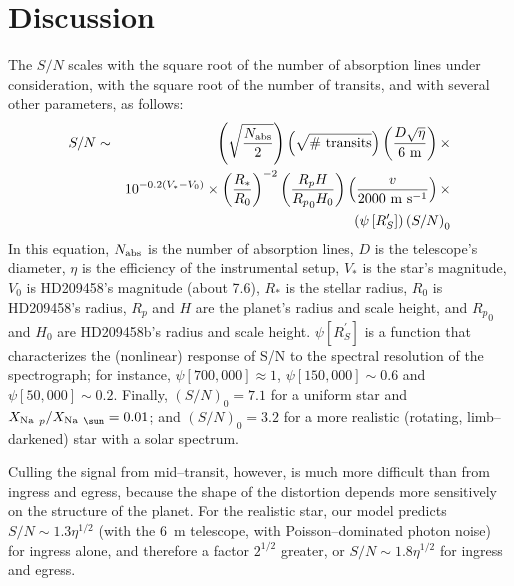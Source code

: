 \documentclass[12pt,preprint]{aastex}
\begin{document}
\section{Discussion}
\label{sec:disc}
The $S/N$ scales with the square root of the number of absorption lines under
consideration, with the square root of the number of transits, and with
several other parameters, as follows:
\begin{eqnarray}
\nonumber S/N & \sim & 
  \left( \sqrt{\frac{N_{\rm abs}}{2} } \right)
  \left( \sqrt{ \#~\rm transits} \right)
  \left( \frac{D \sqrt{\eta}}{\rm 6~m} \right) \times \\
\nonumber & &
  10^{-0.2(V_*-V_0)} \times
  \left(\frac{R_*}{R_0}\right)^{-2}
  \left(\frac{R_p H}{{R_p}_0 H_0}\right)
  \left(\frac{v}{2000 \rm~m~s^{-1}}\right) \times \\
\label{eq:snscale} & &
  \left(\psi\left[R^\prime_S\right]\right)
  \left( S/N \right)_0
\end{eqnarray}
In this equation, $N_{\rm abs}$ is the number of absorption lines,
$D$ is the telescope's diameter, $\eta$ is the efficiency of the instrumental
setup, $V_*$ is the star's magnitude, $V_0$ is HD209458's magnitude
(about 7.6), $R_*$ is the stellar radius, $R_0$ is HD209458's radius,
$R_p$ and $H$ are the planet's radius and scale height, and ${R_p}_0$ and
$H_0$ are HD209458b's radius and scale height.
$\psi[R^\prime_S]$ is a function that characterizes the (nonlinear)
response of S/N to the spectral resolution of the spectrograph; for instance,
$\psi[700,000] \approx 1$, $\psi[150,000] \sim 0.6$ and
$\psi[50,000] \sim 0.2$.  Finally, $(S/N)_0 = 7.1$ for a uniform star and
${X_{\rm Na~}}_p/{X_{\rm Na~}}_\sun = 0.01$; and $(S/N)_0 = 3.2$ for a more
realistic (rotating, limb--darkened) star with a solar spectrum.

Culling the signal from mid--transit, however, is much more difficult
than from ingress and egress, because the shape of the distortion depends
more sensitively on the structure of the planet.  For the realistic
star, our model predicts $S/N \sim 1.3 \eta^{1/2}$ (with the 6~m
telescope, with Poisson--dominated photon noise) for ingress alone, and
therefore a factor $2^{1/2}$ greater, or $S/N \sim 1.8 \eta^{1/2}$ for
ingress and egress.
\end{document}
